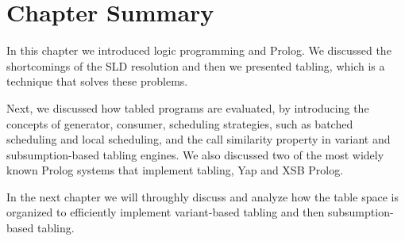 \section{Chapter Summary}

In this chapter we introduced logic programming and Prolog. We discussed the shortcomings of the
SLD resolution and then we presented tabling, which is a technique that solves these problems.

Next, we discussed how tabled programs are evaluated, by introducing the concepts of generator,
consumer, scheduling strategies, such as batched scheduling and local scheduling, and
the call similarity property in variant and subsumption-based tabling engines.
We also discussed two of the most widely known Prolog systems that implement tabling, Yap and XSB Prolog.

In the next chapter we will throughly discuss and analyze how the table space is organized to efficiently
implement variant-based tabling and then subsumption-based tabling.